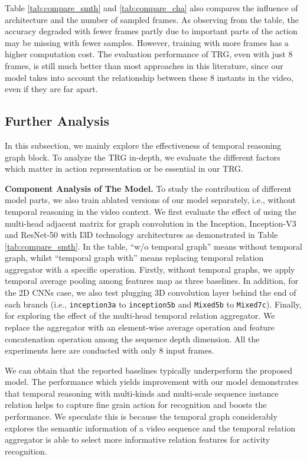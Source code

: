 \documentclass[conference,compsoc]{IEEEtran}
\begin{document}
    Table \ref{tab:compare_smth} and \ref{tab:compare_cha} also compares the inﬂuence of architecture and the number of sampled frames. As observing from the table, the accuracy degraded with fewer frames partly due to important parts of the action may be missing with fewer samples. However, training with more frames has a higher computation cost. The evaluation performance of TRG, even with just 8 frames, is still much better than most approaches in this literature, since our model takes into account the relationship between these 8 instants in the video, even if they are far apart.
    
\subsection{Further Analysis}
    In this subsection, we mainly explore the effectiveness of temporal reasoning graph block. To analyze the TRG in-depth, we evaluate the different factors which matter in action representation or be essential in our TRG.
    
\label{S:4.3}
    \noindent\textbf{Component Analysis of The Model.} To study the contribution of different model parts, we also train ablated versions of our model separately, i.e., without temporal reasoning in the video context. We first evaluate the effect of using the multi-head adjacent matrix for graph convolution in the Inception, Inception-V3 and ResNet-50 with I3D technology architectures as demonstrated in Table \ref{tab:compare_smth}. In the table, ``w/o temporal graph'' means without temporal graph, whilst ``temporal graph with'' means replacing temporal relation aggregator with a specific operation. Firstly, without temporal graphs, we apply temporal average pooling among features map as three baselines. In addition, for the 2D CNNs case, we also test plugging 3D convolution layer behind the end of each branch (i.e., \texttt{inception3a} to \texttt{inception5b} and \texttt{Mixed5b} to \texttt{Mixed7c}). Finally, for exploring the effect of the multi-head temporal relation aggregator. We replace the aggregator with an element-wise average operation and feature concatenation operation among the sequence depth dimension. All the experiments here are conducted with only 8 input frames.
    
    We can obtain that the reported baselines typically underperform the proposed model. The performance which yields improvement with our model demonstrates that temporal reasoning with multi-kinds and multi-scale sequence instance relation helps to capture fine grain action for recognition and boosts the performance. We speculate this is because the temporal graph considerably explores the semantic information of a video sequence and the temporal relation aggregator is able to select more informative relation features for activity recognition.
    
\end{document}
